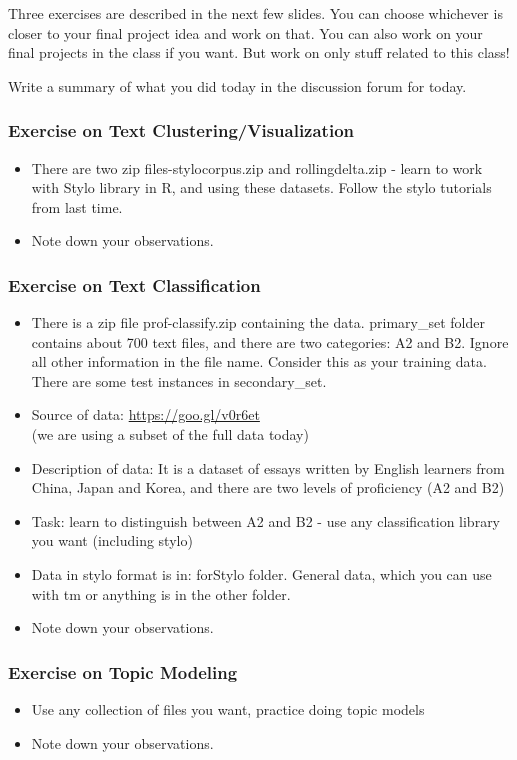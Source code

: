 \documentclass{beamer}
\begin{document}
\begin{frame}
\frametitle{}
Three exercises are described in the next few slides. You can choose whichever is closer to your final project idea and work on that. You can also work on your final projects in the class if you want. But work on only stuff related to this class! \bigskip

Write a summary of what you did today in the discussion forum for today. 
\end{frame}


\begin{frame}
\frametitle{Exercise on Text Clustering/Visualization}
\begin{itemize}
\item There are two zip files-stylocorpus.zip and rollingdelta.zip - learn to work with Stylo library in R, and using these datasets. Follow the stylo tutorials from last time.
\item Note down your observations. 
\end{itemize}
\end{frame}

\begin{frame}
\frametitle{Exercise on Text Classification}
\begin{itemize}
\item There is a zip file prof-classify.zip containing the data. primary\_set folder contains about 700 text files, and there are two categories: A2 and B2. Ignore all other information in the file name. Consider this as your training data. There are some test instances in secondary\_set.
\item Source of data: \url{https://goo.gl/v0r6et}
\\ (we are using a subset of the full data today)
\item Description of data: It is a dataset of essays written by English learners from China, Japan and Korea, and there are two levels of proficiency (A2 and B2)
\item Task: learn to distinguish between A2 and B2 - use any classification library you want (including stylo)
\item Data in stylo format is in: forStylo folder. General data, which you can use with tm or anything is in the other folder. 
\item Note down your observations. 
\end{itemize}
\end{frame}

\begin{frame}
\frametitle{Exercise on Topic Modeling}
\begin{itemize}
\item Use any collection of files you want, practice doing topic models 
\item Note down your observations. 
\end{itemize}
\end{frame}
\end{document}
